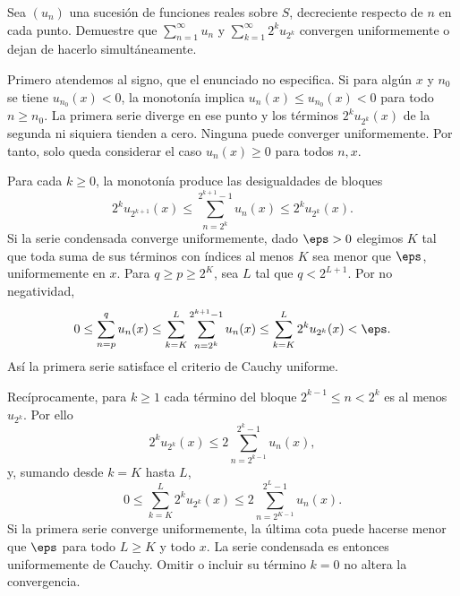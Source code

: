 \begin{ejercicio}\label{ej:lectura-26-8}
Sea $(u_n)$ una sucesión de funciones reales sobre $S$, decreciente respecto de $n$ en cada punto. Demuestre que $\sum_{n=1}^\infty u_n$ y $\sum_{k=1}^\infty 2^ku_{2^k}$ convergen uniformemente o dejan de hacerlo simultáneamente.
\end{ejercicio}
\begin{solucion}
Primero atendemos al signo, que el enunciado no especifica. Si para algún $x$ y $n_0$ se tiene $u_{n_0}(x)<0$, la monotonía implica $u_n(x)\le u_{n_0}(x)<0$ para todo $n\ge n_0$. La primera serie diverge en ese punto y los términos $2^ku_{2^k}(x)$ de la segunda ni siquiera tienden a cero. Ninguna puede converger uniformemente. Por tanto, solo queda considerar el caso $u_n(x)\ge0$ para todos $n,x$.

Para cada $k\ge0$, la monotonía produce las desigualdades de bloques
\[
 2^ku_{2^{k+1}}(x)
 \le\sum_{n=2^k}^{2^{k+1}-1}u_n(x)
 \le2^ku_{2^k}(x).
\]
Si la serie condensada converge uniformemente, dado $\eps>0$ elegimos $K$ tal que toda suma de sus términos con índices al menos $K$ sea menor que $\eps$, uniformemente en $x$. Para $q\ge p\ge2^K$, sea $L$ tal que $q<2^{L+1}$. Por no negatividad,
\[
 0\le\sum_{n=p}^qu_n(x)
 \le\sum_{k=K}^L\sum_{n=2^k}^{2^{k+1}-1}u_n(x)
 \le\sum_{k=K}^L2^ku_{2^k}(x)<\eps.
\]
Así la primera serie satisface el criterio de Cauchy uniforme.

Recíprocamente, para $k\ge1$ cada término del bloque $2^{k-1}\le n<2^k$ es al menos $u_{2^k}$. Por ello
\[
 2^ku_{2^k}(x)\le2\sum_{n=2^{k-1}}^{2^k-1}u_n(x),
\]
y, sumando desde $k=K$ hasta $L$,
\[
 0\le\sum_{k=K}^L2^ku_{2^k}(x)
 \le2\sum_{n=2^{K-1}}^{2^L-1}u_n(x).
\]
Si la primera serie converge uniformemente, la última cota puede hacerse menor que $\eps$ para todo $L\ge K$ y todo $x$. La serie condensada es entonces uniformemente de Cauchy. Omitir o incluir su término $k=0$ no altera la convergencia.
\end{solucion}

